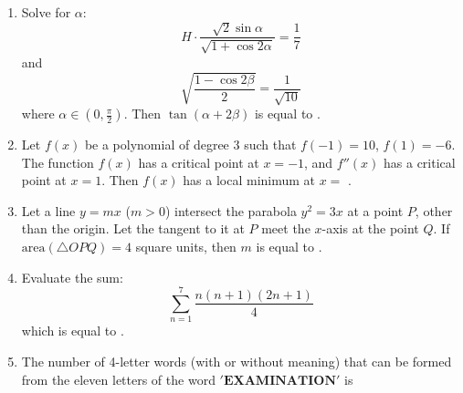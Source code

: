 \documentclass{article}
\begin{document}
\begin{enumerate}
\item Solve for $\alpha$:
\[
H \cdot \frac{\sqrt{2} \sin \alpha}{\sqrt{1 + \cos 2\alpha}} = \frac{1}{7}
\]
and 
\[
\sqrt{\frac{1 - \cos 2\beta}{2}} = \frac{1}{\sqrt{10}}
\]
where $\alpha \in (0, \frac{\pi}{2})$. Then $\tan(\alpha + 2\beta)$ is equal to \underline{\hspace{2cm}}.

\item Let $f(x)$ be a polynomial of degree $3$ such that $f(-1) = 10$, $f(1) = -6$. The function $f(x)$ has a critical point at $x = -1$, and $f''(x)$ has a critical point at $x = 1$. Then $f(x)$ has a local minimum at $x = $ \underline{\hspace{2cm}}.

\item Let a line $y = mx$ ($m > 0$) intersect the parabola $y^2 = 3x$ at a point $P$, other than the origin. Let the tangent to it at $P$ meet the $x$-axis at the point $Q$. If $\text{area}(\triangle OPQ) = 4$ square units, then $m$ is equal to \underline{\hspace{2cm}}.

\item Evaluate the sum:
\[
\sum_{n=1}^{7} \frac{n(n + 1)(2n + 1)}{4}
\]
which is equal to \underline{\hspace{2cm}}.

\item The number of 4-letter words (with or without meaning) that can be formed from the eleven letters of the word $'\textbf{EXAMINATION}'$ is \underline{\hspace{2cm}}

\end{enumerate}
\end{document}
